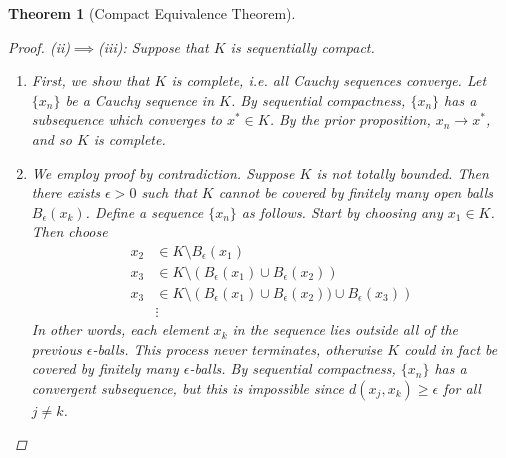 \documentclass[12pt]{amsart}         %
\newtheorem{theorem}{Theorem}[section]
\theoremstyle{remark}
\begin{document}
\begin{theorem}[Compact Equivalence Theorem]
\begin{proof}
(ii)$\implies$(iii): Suppose that $K$ is sequentially compact.
\begin{enumerate}
\item First, we show that $K$ is complete, i.e. all Cauchy sequences converge. Let $\{x_n\}$ be a Cauchy sequence in $K$. By sequential compactness, $\{x_n\}$ has a subsequence which converges to $x^* \in K$. By the prior proposition, $x_n \rightarrow x^*$, and so $K$ is complete.
\item We employ proof by contradiction. Suppose $K$ is not totally bounded. Then there exists $\epsilon > 0$ such that $K$ cannot be covered by finitely many open balls $B_\epsilon(x_k)$. Define a sequence $\{x_n\}$ as follows. Start by choosing any $x_1 \in K$. Then choose
\begin{align*}
x_2 &\in K\setminus B_\epsilon(x_1) \\
x_3 &\in K\setminus \left(B_\epsilon(x_1) \cup B_\epsilon(x_2) \right) \\
x_3 &\in K\setminus \left(B_\epsilon(x_1) \cup B_\epsilon(x_2)) \cup B_\epsilon(x_3)\right) \\
&\vdots
\end{align*}
In other words, each element $x_k$ in the sequence lies outside all of the previous $\epsilon$-balls. This process never terminates, otherwise $K$ could in fact be covered by finitely many $\epsilon$-balls. By sequential compactness, $\{x_n\}$ has a convergent subsequence, but this is impossible since $d(x_j, x_k) \geq \epsilon$ for all $j \neq k$.
\end{enumerate}


\end{proof}
\end{theorem}
\end{document}
